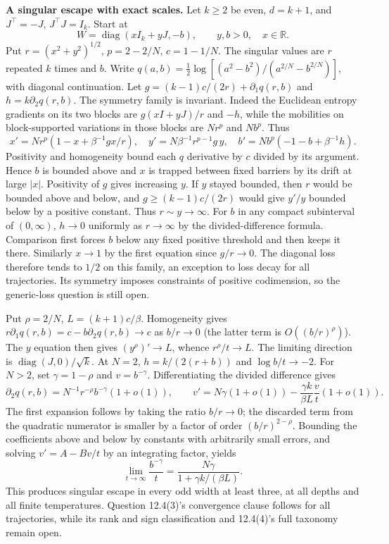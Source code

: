 \documentclass[10pt]{article}
\begin{document}
\textbf{A singular escape with exact scales.} Let $k\ge2$ be even, $d=k+1$, and $J^\top=-J$, $J^\top J=I_k$. Start at
\[
 W=\operatorname{diag}(xI_k+yJ,-b),\qquad y,b>0,\quad x\in\mathbb R.
\]
Put $r=(x^2+y^2)^{1/2}$, $p=2-2/N$, $c=1-1/N$. The singular values are $r$ repeated $k$ times and $b$. Write $q(a,b)=\frac12\log[(a^2-b^2)/(a^{2/N}-b^{2/N})]$, with diagonal continuation. Let $g=(k-1)c/(2r)+\partial_1 q(r,b)$ and $h=k\partial_2 q(r,b)$. The symmetry family is invariant. Indeed the Euclidean entropy gradients on its two blocks are $g(xI+yJ)/r$ and $-h$, while the mobilities on block-supported variations in those blocks are $Nr^p$ and $Nb^p$. Thus
\[
 x'=Nr^p(1-x+\beta^{-1}gx/r),\quad
 y'=N\beta^{-1}r^{p-1}g\,y,\quad
 b'=Nb^p(-1-b+\beta^{-1}h).
\]
Positivity and homogeneity bound each $q$ derivative by $c$ divided by its argument. Hence $b$ is bounded above and $x$ is trapped between fixed barriers by its drift at large $|x|$. Positivity of $g$ gives increasing $y$. If $y$ stayed bounded, then $r$ would be bounded above and below, and $g\ge(k-1)c/(2r)$ would give $y'/y$ bounded below by a positive constant. Thus $r\sim y\to\infty$. For $b$ in any compact subinterval of $(0,\infty)$, $h\to0$ uniformly as $r\to\infty$ by the divided-difference formula. Comparison first forces $b$ below any fixed positive threshold and then keeps it there. Similarly $x\to1$ by the first equation since $g/r\to0$. The diagonal loss therefore tends to $1/2$ on this family, an exception to loss decay for all trajectories. Its symmetry imposes constraints of positive codimension, so the generic-loss question is still open.

Put $\rho=2/N$, $L=(k+1)c/\beta$. Homogeneity gives $r\partial_1q(r,b)=c-b\partial_2 q(r,b)\to c$ as $b/r\to0$ (the latter term is $O((b/r)^\rho)$). The $y$ equation then gives $(y^\rho)'\to L$, whence $r^\rho/t\to L$. The limiting direction is $\operatorname{diag}(J,0)/\sqrt k$. At $N=2$, $h=k/(2(r+b))$ and $\log b/t\to-2$. For $N>2$, set $\gamma=1-\rho$ and $v=b^{-\gamma}$. Differentiating the divided difference gives
\[
 \partial_2 q(r,b)=N^{-1}r^{-\rho}b^{-\gamma}(1+o(1)),\qquad
 v'=N\gamma(1+o(1))-\frac{\gamma k}{\beta L}\frac{v}{t}(1+o(1)).
\]
The first expansion follows by taking the ratio $b/r\to0$; the discarded term from the quadratic numerator is smaller by a factor of order $(b/r)^{2-\rho}$. Bounding the coefficients above and below by constants with arbitrarily small errors, and solving $v'=A-Bv/t$ by an integrating factor, yields
\[
 \lim_{t\to\infty}\frac{b^{-\gamma}}t=
 \frac{N\gamma}{1+\gamma k/(\beta L)}.
\]
This produces singular escape in every odd width at least three, at all depths and all finite temperatures. Question 12.4(3)'s convergence clause follows for all trajectories, while its rank and sign classification and 12.4(4)'s full taxonomy remain open.
\end{document}
